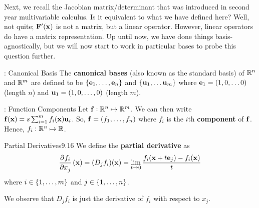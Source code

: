\noindent Next, we recall the Jacobian matrix/determinant that was introduced in second year multivariable calculus. Is it equivalent to what we have defined here? Well, not quite; $\mathbf{F}'(\mathbf{x})$ is not a matrix, but a linear operator. However, linear operators do have a matrix representation. Up until now, we have done things basis-agnostically, but we will now start to work in particular bases to probe this question further.

\begin{ndef}{: Canonical Basis}{}
    The \textbf{canonical bases} (also known as the standard basis) of $\mathbb{R}^n$ and $\mathbb{R}^m$ are defined to be $\set{\ensuremath{\mathbf{e}}_1, \ldots, \ensuremath{\mathbf{e}}_n}$ and $\set{\ensuremath{\mathbf{u}}_1, \ldots \ensuremath{\mathbf{u}}_m}$ where $\mathbf{e}_1 = (1, 0, \ldots 0)$ (length $n$) and $\mathbf{u}_1 = (1, 0, \ldots, 0)$ (length $m$).
\end{ndef}

\begin{ndef}{: Function Components}{}
    Let $\mathbf{f}: \mathbb{R}^n \mapsto \mathbb{R}^m$. We can then write $\mathbf{f}(\mathbf{x}) = s\sum_{i=1}^m f_i(\mathbf{x})\mathbf{u}_i$. So, $\mathbf{f} = (f_1, \ldots, f_n)$ where $f_i$ is the $i$th \textbf{component} of $\mathbf{f}$. Hence, $f_i: \mathbb{R}^n \mapsto \mathbb{R}$. 
\end{ndef}

\begin{definition}{Partial Derivatives}{9.16}
    We define the \textbf{partial derivative} as
    \begin{align*}
        \dpd{f_i}{x_j}(\v{x}) = (D_jf_i)(\v{x}) = \lim_{t \rightarrow 0} \frac{f_i(\v{x} + t\v{e}_j) - f_i(\v{x})}{t}
    \end{align*}
    where $i \in \set{1, \ldots, m}$ and $j \in \set{1, \ldots, n}$.
\end{definition}
\noindent We observe that $D_jf_i$ is just the derivative of $f_i$ with respect to $x_j$.


